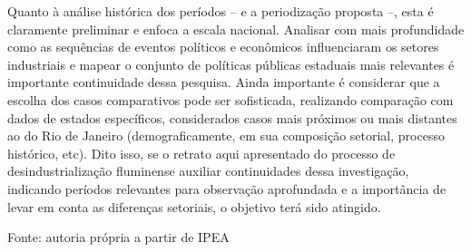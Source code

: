 Quanto à análise histórica dos períodos -- e a periodização proposta --,
esta é claramente preliminar e enfoca a escala nacional. Analisar com
mais profundidade como as sequências de eventos políticos e econômicos
influenciaram os setores industriais e mapear o conjunto de políticas
públicas estaduais mais relevantes é importante continuidade dessa
pesquisa. Ainda importante é considerar que a escolha dos casos
comparativos pode ser sofisticada, realizando comparação com dados de
estados específicos, considerados casos mais próximos ou mais distantes
ao do Rio de Janeiro (demograficamente, em sua composição setorial,
processo histórico, etc). Dito isso, se o retrato aqui apresentado do
processo de desindustrialização fluminense auxiliar continuidades dessa
investigação, indicando períodos relevantes para observação aprofundada
e a importância de levar em conta as diferenças setoriais, o objetivo
terá sido atingido.

\begin{table}[htbp]
\centering
\caption{Anexo 1 -- erros da média móvel}
\label{tab:cap06-anexo1-erros-media-movel}
\end{table}

Fonte: autoria própria a partir de IPEA
